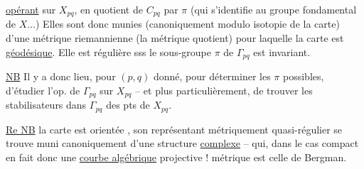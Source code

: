\uline{opérant}   sur $X_{pq}$, en  quotient de $C_{pq}$ par $\pi$ (qui s'identifie au groupe fondamental de $X\ldots$) Elles sont donc munies (canoniquement modulo isotopie de la carte) d'une métrique riemannienne (la métrique quotient) pour laquelle la carte est \uline{géodésique}.  Elle est régulière sss le sous-groupe $\pi$ de $\Gamma_{pq}$ est invariant.

\uline{NB} Il y a donc lieu, pour  $(p,q)$ donné, pour déterminer les $\pi$ possibles, d'étudier  l'op. de $\Gamma_{pq}$ sur $X_{pq}$ -- et plus particulièrement, de trouver les   stabilisateurs dans $\Gamma_{pq}$ des pts de $X_{pq}$.

 \uline{Re NB}   la carte  est orientée ,  son représentant métriquement quasi-régulier se trouve muni canoniquement d'une structure \uline{complexe} -- qui, dans le cas compact   en fait donc une \uline{courbe algébrique} projective  !  métrique est celle de Bergman.

